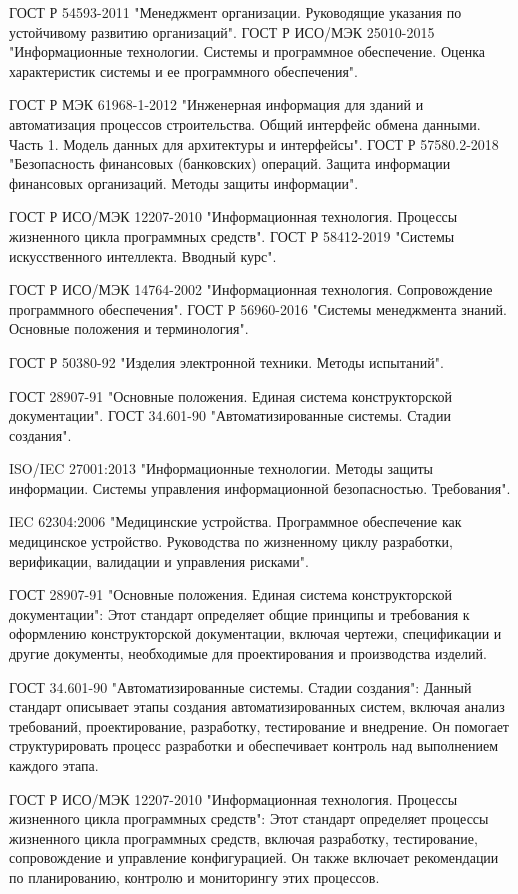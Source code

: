 ГОСТ Р 54593-2011 "Менеджмент организации. Руководящие указания по устойчивому развитию организаций".
ГОСТ Р ИСО/МЭК 25010-2015 "Информационные технологии. Системы и программное обеспечение. Оценка характеристик системы и ее программного обеспечения".

ГОСТ Р МЭК 61968-1-2012 "Инженерная информация для зданий и автоматизация процессов строительства. Общий интерфейс обмена данными. Часть 1. Модель данных для архитектуры и интерфейсы".
ГОСТ Р 57580.2-2018 "Безопасность финансовых (банковских) операций. Защита информации финансовых организаций. Методы защиты информации".

ГОСТ Р ИСО/МЭК 12207-2010 "Информационная технология. Процессы жизненного цикла программных средств".
ГОСТ Р 58412-2019 "Системы искусственного интеллекта. Вводный курс".

ГОСТ Р ИСО/МЭК 14764-2002 "Информационная технология. Сопровождение программного обеспечения".
ГОСТ Р 56960-2016 "Системы менеджмента знаний. Основные положения и терминология".

ГОСТ Р 50380-92 "Изделия электронной техники. Методы испытаний".

ГОСТ 28907-91 "Основные положения. Единая система конструкторской документации".
ГОСТ 34.601-90 "Автоматизированные системы. Стадии создания".

ISO/IEC 27001:2013 "Информационные технологии. Методы защиты информации. Системы управления информационной безопасностью. Требования".

IEC 62304:2006 "Медицинские устройства. Программное обеспечение как медицинское устройство. Руководства по жизненному циклу разработки, верификации, валидации и управления рисками".

ГОСТ 28907-91 "Основные положения. Единая система конструкторской документации": Этот стандарт определяет общие принципы и требования к оформлению конструкторской документации, включая чертежи, спецификации и другие документы, необходимые для проектирования и производства изделий.

ГОСТ 34.601-90 "Автоматизированные системы. Стадии создания": Данный стандарт описывает этапы создания автоматизированных систем, включая анализ требований, проектирование, разработку, тестирование и внедрение. Он помогает структурировать процесс разработки и обеспечивает контроль над выполнением каждого этапа.

ГОСТ Р ИСО/МЭК 12207-2010 "Информационная технология. Процессы жизненного цикла программных средств": Этот стандарт определяет процессы жизненного цикла программных средств, включая разработку, тестирование, сопровождение и управление конфигурацией. Он также включает рекомендации по планированию, контролю и мониторингу этих процессов.

